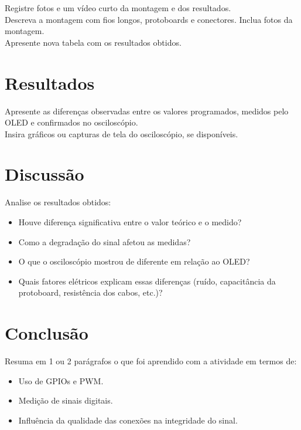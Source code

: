 \documentclass{article}
\begin{document}
Registre fotos e um vídeo curto da montagem e dos resultados. \\
Descreva a montagem com fios longos, protoboards e conectores. Inclua fotos da montagem. \\
Apresente nova tabela com os resultados obtidos.

\section{Resultados}
Apresente as diferenças observadas entre os valores programados, medidos pelo OLED e confirmados no osciloscópio. \\
Insira gráficos ou capturas de tela do osciloscópio, se disponíveis.

\section{Discussão}
Analise os resultados obtidos:
\begin{itemize}
    \item Houve diferença significativa entre o valor teórico e o medido?
    \item Como a degradação do sinal afetou as medidas?
    \item O que o osciloscópio mostrou de diferente em relação ao OLED?
    \item Quais fatores elétricos explicam essas diferenças (ruído, capacitância da protoboard, resistência dos cabos, etc.)?
\end{itemize}

\section{Conclusão}
Resuma em 1 ou 2 parágrafos o que foi aprendido com a atividade em termos de:
\begin{itemize}
    \item Uso de GPIOs e PWM.
    \item Medição de sinais digitais.
    \item Influência da qualidade das conexões na integridade do sinal.
\end{itemize}
\end{document}
